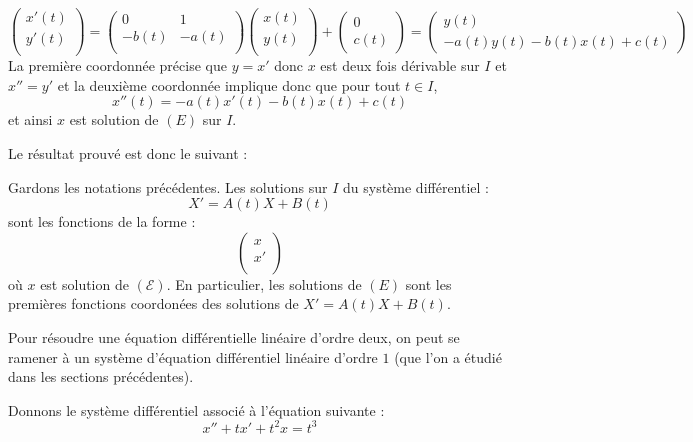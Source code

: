 \documentclass[a4paper,10pt]{report}
\begin{document}
\begin{itemize}
$$\begin{pmatrix}
x'(t) \\
y'(t) \\
\end{pmatrix} =  \begin{pmatrix}
0 & 1 \\
-b(t) & - a(t) \\
\end{pmatrix} \begin{pmatrix}
x(t) \\
y(t) \\
\end{pmatrix} + \begin{pmatrix}
0 \\
c(t)
\end{pmatrix} = \begin{pmatrix}
y(t) \\
-a(t) y(t)-b(t)x(t)+c(t)
\end{pmatrix}$$
La première coordonnée précise que $y=x'$ donc $x$ est deux fois dérivable sur $I$ et $x''=y'$ et la deuxième coordonnée implique donc que pour tout $t \in I$,
$$ x''(t)= -a(t)x'(t)-b(t)x(t)+c(t)$$
et ainsi $x$ est solution de $(E)$ sur $I$.
\end{itemize}

\medskip

\noindent Le résultat prouvé est donc le suivant :

\begin{prop} Gardons les notations précédentes. Les solutions sur $I$ du système différentiel :
$$ X'= A(t)X+B(t) $$
sont les fonctions de la forme :
$$ \begin{pmatrix}
x \\
x' \\
\end{pmatrix}$$
où $x$ est solution de $(\mathcal{E})$. En particulier, les solutions de $(E)$ sont les premières fonctions coordonées des solutions de $X'=A(t)X+B(t)$.
\end{prop}

\begin{retenir} Pour résoudre une équation différentielle linéaire d'ordre deux, on peut se ramener à un système d'équation différentiel linéaire d'ordre $1$ (que l'on a étudié dans les sections précédentes).
\end{retenir}

\begin{ex} Donnons le système différentiel associé à l'équation suivante :
$$ x''+tx'+t^2x=t^3$$

\vspace{4cm}
\end{ex}
\end{document}
